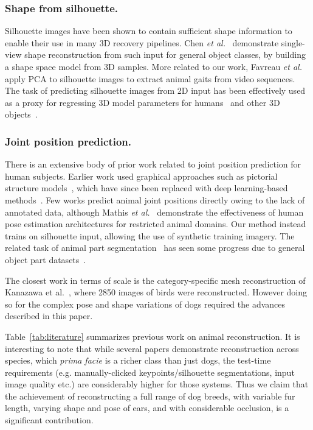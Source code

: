 \subsubsection*{Shape from silhouette.} Silhouette images have been shown to contain sufficient shape information to enable their use in many 3D recovery pipelines. Chen {\em et al.}~\cite{chen2010inferring} demonstrate single-view shape reconstruction from such input for general object classes, by building a shape space model from 3D samples. More related to our work, Favreau {\em et al.}~\cite{favreau2004animal} apply PCA to silhouette images to extract animal gaits from video sequences. The task of predicting silhouette images from 2D input has been effectively used as a proxy for regressing 3D model parameters for humans~\cite{tan17indirect,kanazawa18end-to-end} and other 3D objects~\cite{wiles2017silnet}.

\subsubsection*{Joint position prediction.} There is an extensive body of prior work related to joint position prediction for human subjects. Earlier work used graphical approaches such as pictorial structure models~\cite{andriluka2010monocular,pishchulin2013poselet,johnson2010clustered}, which have since been replaced with deep learning-based methods~\cite{cao2017realtime,bulat2016human}. Few works predict animal joint positions directly owing to the lack of annotated data, although Mathis {\em et al.}~\cite{mathis2018deeplabcut} demonstrate the effectiveness of human pose estimation architectures for restricted animal domains. Our method instead trains on silhouette input, allowing the use of synthetic training imagery. The related task of animal part segmentation~\cite{wang2015joint,wang2015semantic} has seen some progress due to general object part datasets~\cite{chen_cvpr14,zhou2017scene}.




The closest work in terms of scale is the category-specific mesh reconstruction of Kanazawa et al.~\cite{kanazawa2018birds}, where 2850 images of birds were reconstructed.  However doing so for the complex pose and shape variations of dogs required the advances described in this paper.

Table~\ref{tab:literature} summarizes previous work on animal reconstruction.
It is interesting to note that while several papers demonstrate reconstruction across species, which {\em prima facie} is a richer class than just dogs, the test-time requirements (e.g. manually-clicked keypoints/silhouette segmentations, input image quality etc.) are considerably higher for those systems.
Thus we claim that the achievement of reconstructing a full range of dog breeds, 
with variable fur length, varying shape and pose of ears, and with considerable occlusion, is a significant contribution.

